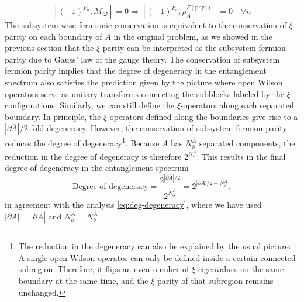 \documentclass[12font]{article}
\theoremstyle{definition}
\newcommand{\abs}[1]{\left|  #1  \right|}
\newcommand{\de}{\partial}
\newcommand{\mrm}[1]{\mathrm{#1}}
\begin{document}
\[
[(-1)^{F_n}, \mathcal{M}_{\mathfrak{D}}] = 0 \Longrightarrow [(-1)^{F_n}, \rho^{F(\mrm{phys})}_{\overline{A}}] = 0 \quad\forall n
\]
The subsystem-wise fermionic conservation is equivalent to the conservation of $\xi$-parity on each boundary of $A$ in the original problem, as we showed in the previous section that the $\xi$-parity can be interpreted as the subsystem fermion parity due to Gauss' law of the gauge theory. The conservation of subsystem fermion parity implies that the degree of degeneracy in the entanglement spectrum also satisfies the prediction given by the picture where open Wilson operators serve as unitary transforms connecting the subblocks labeled by the $\xi$-configurations. Similarly, we can still define the $\xi$-operators along each separated boundary. In principle, the $\xi$-operators defined along the boundaries give rise to a $\abs{\de \overline{A}}/2$-fold degeneracy. However, the conservation of subsystem fermion parity reduces the degree of degeneracy\footnote{The reduction in the degeneracy can also be explained by the usual picture: A single open Wilson operator can only be defined inside a certain connected subregion. Therefore, it flips an even number of $\xi$-eigenvalues on the same boundary at the same time, and the $\xi$-parity of that subregion remains unchanged. }. Because $\overline{A}$ has $N^{\overline{A}}_{\de}$ separated components, the reduction in the degree of degeneracy is therefore $2^{N^{\overline{A}}_\de}$. This results in the final degree of degeneracy in the entanglement spectrum
\[
\text{Degree of degeneracy} = \frac{2^{\abs{\de\overline{A}}/2}}{2^{N^{\overline{A}}_\de}} = 2^{\abs{\de A}/2 - N^A_\de},
\]
in agreement with the analysis \eqref{eq:deg-degeneracy}, where we have used $\abs{\de A} = \abs{\de \overline{A}}$ and $N^{A}_\de = N^{\overline{A}}_\de$. 
\end{document}
